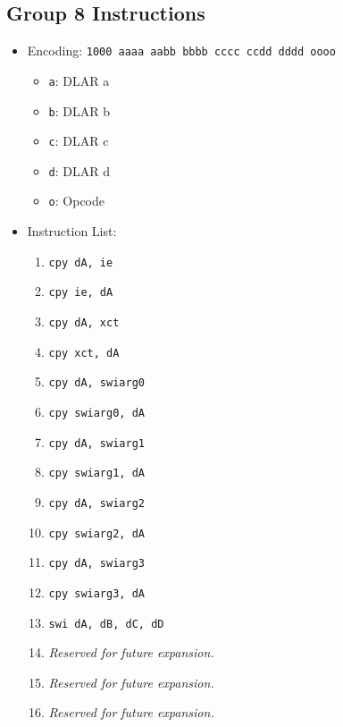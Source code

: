 \documentclass{article}
\begin{document}
	\subsection{Group 8 Instructions}
		\begin{itemize}
		\item Encoding: \texttt{1000 aaaa aabb bbbb  cccc ccdd dddd oooo}
			\begin{itemize}
			\item \texttt{a}: DLAR a
			\item \texttt{b}: DLAR b
			\item \texttt{c}: DLAR c
			\item \texttt{d}: DLAR d
			\item \texttt{o}: Opcode
			\end{itemize}

		\item Instruction List:
			\begin{enumerate}
			\item \texttt{cpy dA, ie}
			\item \texttt{cpy ie, dA}
			\item \texttt{cpy dA, xct}
			\item \texttt{cpy xct, dA}

			\item \texttt{cpy dA, swiarg0}
			\item \texttt{cpy swiarg0, dA}
			\item \texttt{cpy dA, swiarg1}
			\item \texttt{cpy swiarg1, dA}

			\item \texttt{cpy dA, swiarg2}
			\item \texttt{cpy swiarg2, dA}
			\item \texttt{cpy dA, swiarg3}
			\item \texttt{cpy swiarg3, dA}

			\item \texttt{swi dA, dB, dC, dD}
			\item \textit{Reserved for future expansion.}
			\item \textit{Reserved for future expansion.}
			\item \textit{Reserved for future expansion.}
			\end{enumerate}
		\end{itemize}
\end{document}
